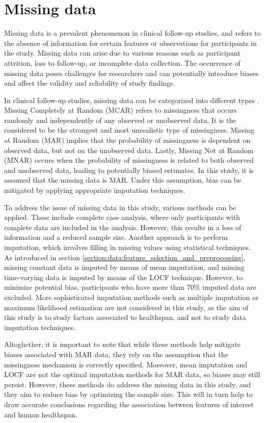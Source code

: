 \section{Missing data}
\label{section:data:missing_data}
Missing data is a prevalent phenomenon in clinical follow-up studies, and refers to the absence of information for certain features or observations for participants in the study. Missing data can arise due to various reasons such as participant attrition, loss to follow-up, or incomplete data collection. The occurrence of missing data poses challenges for researchers and can potentially introduce biases and affect the validity and reliability of study findings.

In clinical follow-up studies, missing data can be categorized into different types \citep{mack2018managing}. Missing Completely at Random (MCAR) refers to missingness that occurs randomly and independently of any observed or unobserved data. It is the considered to be the strongest and most unrealistic type of missingness. Missing at Random (MAR) implies that the probability of missingness is dependent on observed data, but not on the unobserved data. Lastly, Missing Not at Random (MNAR) occurs when the probability of missingness is related to both observed and unobserved data, leading to potentially biased estimates. In this study, it is assumed that the missing data is MAR. Under this assumption, bias can be mitigated by applying appropriate imputation techniques. 

To address the issue of missing data in this study, various methods can be applied. These include complete case analysis, where only participants with complete data are included in the analysis. However, this results in a loss of information and a reduced sample size. Another approach is to perform imputation, which involves filling in missing values using statistical techniques. As introduced in section \ref{section:data:feature_selection_and_preprocessing}, missing constant data is imputed by means of mean imputation, and missing time-varying data is imputed by means of the LOCF technique. However, to minimize potential bias, participants who have more than 70\% imputed data are excluded. More sophisticated imputation methods such as multiple imputation or maximum likelihood estimation are not considered in this study, as the aim of this study is to study factors associated to healthspan, and not to study data imputation techniques.  

Altoghether, it is important to note that while these methods help mitigate biases associated with MAR data, they rely on the assumption that the missingness mechanism is correctly specified. Moreover, mean imputation and LOCF are not the optimal imputation methods for MAR data, so biases may still persist. However, these methods do address the missing data in this study, and they aim to reduce bias by optimizing the sample size. This will in turn help to draw accurate conclusions regarding the association between features of interest and human healthspan. 